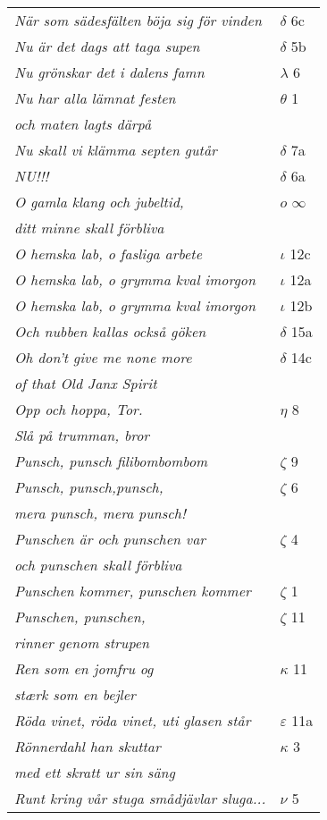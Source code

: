\documentclass[a6paper,10pt]{article}
\begin{document}
\newpage
\setlength{\oddsidemargin}{-0.37in}
\begin{table}[!h]
\begin{tabular}{l l}
\textit{När som sädesfälten böja sig för vinden}	&$\delta$ 6c\\
\textit{Nu är det dags att taga supen}	&$\delta$ 5b\\
\textit{Nu grönskar det i dalens famn}	&$\lambda$ 6\\
\textit{Nu har alla lämnat festen}	&$\theta$ 1\\
\textit{och maten lagts därpå} &\\
\textit{Nu skall vi klämma septen gutår}	&$\delta$ 7a\\
\textit{NU!!!}	&$\delta$ 6a\\
\textit{O gamla klang och jubeltid,}	&$o$ $\infty$\\
\textit{ditt minne skall förbliva} &\\
\textit{O hemska lab, o fasliga arbete}	&$\iota$ 12c\\
\textit{O hemska lab, o grymma kval imorgon}	&$\iota$ 12a\\
\textit{O hemska lab, o grymma kval imorgon}	&$\iota$ 12b\\
\textit{Och nubben kallas också göken}	&$\delta$ 15a\\
\textit{Oh don't give me none more}	&$\delta$ 14c\\
\textit{of that Old Janx Spirit} &\\
\textit{Opp och hoppa, Tor.}	&$\eta$ 8\\
\textit{Slå på trumman, bror} &\\
\textit{Punsch, punsch filibombombom}	&$\zeta$ 9\\
\textit{Punsch, punsch,punsch,}	&$\zeta$ 6\\
\textit{mera punsch, mera punsch!} &\\
\textit{Punschen är och punschen var}	&$\zeta$ 4\\
\textit{och punschen skall förbliva} &\\
\textit{Punschen kommer, punschen kommer}	&$\zeta$ 1\\
\textit{Punschen, punschen,}	&$\zeta$ 11\\
\textit{rinner genom strupen} &\\
\textit{Ren som en jomfru og}	&$\kappa$ 11\\
\textit{stærk som en bejler} &\\
\textit{Röda vinet, röda vinet, uti glasen står}	&$\varepsilon$ 11a\\
\textit{Rönnerdahl han skuttar}	&$\kappa$ 3\\
\textit{med ett skratt ur sin säng} &\\
\textit{Runt kring vår stuga smådjävlar sluga...}	&$\nu$ 5\\
\end{tabular}
\end{table}
\end{document}
